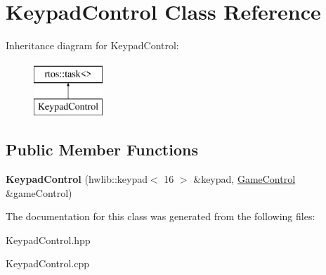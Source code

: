 \hypertarget{class_keypad_control}{}\section{Keypad\+Control Class Reference}
\label{class_keypad_control}
Inheritance diagram for Keypad\+Control\+:\begin{figure}[H]
\begin{center}
\leavevmode
\includegraphics[height=2.000000cm]{class_keypad_control}
\end{center}
\end{figure}
\subsection*{Public Member Functions}
\begin{DoxyCompactItemize}
\item 
{\bfseries Keypad\+Control} (hwlib\+::keypad$<$ 16 $>$ \&keypad, \hyperlink{class_game_control}{Game\+Control} \&game\+Control)\hypertarget{class_keypad_control_ab6a306abe67081b5cbd1973dd7db5ff5}{}\label{class_keypad_control_ab6a306abe67081b5cbd1973dd7db5ff5}

\end{DoxyCompactItemize}


The documentation for this class was generated from the following files\+:\begin{DoxyCompactItemize}
\item 
Keypad\+Control.\+hpp\item 
Keypad\+Control.\+cpp\end{DoxyCompactItemize}
